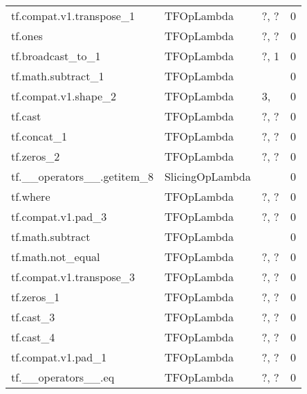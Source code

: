 \begin{longtable}{llll}
   tf.compat.v1.transpose\_1 &             TFOpLambda &                           ?, ? &        0 \\
                    tf.ones &             TFOpLambda &                           ?, ? &        0 \\
          tf.broadcast\_to\_1 &             TFOpLambda &                              ?, 1 &        0 \\
         tf.math.subtract\_1 &             TFOpLambda &                                      &        0 \\
       tf.compat.v1.shape\_2 &             TFOpLambda &                                   3, &        0 \\
                    tf.cast &             TFOpLambda &                           ?, ? &        0 \\
                tf.concat\_1 &             TFOpLambda &                           ?, ? &        0 \\
                 tf.zeros\_2 &             TFOpLambda &                           ?, ? &        0 \\
 tf.\_\_operators\_\_.getitem\_8 &        SlicingOpLambda &                                      &        0 \\
                   tf.where &             TFOpLambda &                           ?, ? &        0 \\
         tf.compat.v1.pad\_3 &             TFOpLambda &                           ?, ? &        0 \\
           tf.math.subtract &             TFOpLambda &                                      &        0 \\
          tf.math.not\_equal &             TFOpLambda &                           ?, ? &        0 \\
   tf.compat.v1.transpose\_3 &             TFOpLambda &                           ?, ? &        0 \\
                 tf.zeros\_1 &             TFOpLambda &                           ?, ? &        0 \\
                  tf.cast\_3 &             TFOpLambda &                           ?, ? &        0 \\
                  tf.cast\_4 &             TFOpLambda &                           ?, ? &        0 \\
         tf.compat.v1.pad\_1 &             TFOpLambda &                           ?, ? &        0 \\
        tf.\_\_operators\_\_.eq &             TFOpLambda &                           ?, ? &        0 \\

\end{longtable}
